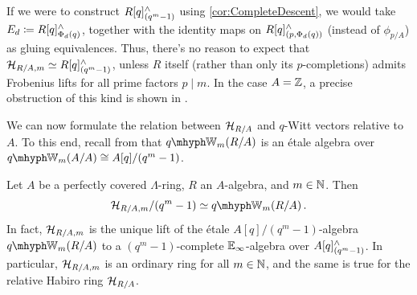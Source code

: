 \documentclass[DIV=12,numbers=enddot,leqno,bibliography=totoc]{scrartcl}
\begin{document}
	\begin{rem}
		If we were to construct $R[q]_{(q^m-1)}^\wedge$ using \cref{cor:CompleteDescent}, we would take $E_d\coloneqq R[q]_{\Phi_d(q)}^\complete$, together with the identity maps on $R[q]_{(p,\Phi_d(q))}^\wedge$ (instead of $\phi_{p/A}$) as gluing equivalences. Thus, there's no reason to expect that $\mathcal{H}_{R/A,  m}\simeq R[q]_{(q^m-1)}^\wedge$, unless $R$ itself (rather than only its $p$-completions) admits Frobenius lifts for all prime factors $p\mid m$. In the case $A=\mathbb{Z}$, a precise obstruction of this kind is shown in \cite[Corollary~]{qWitt}.
	\end{rem}
	We can now formulate the relation between $\mathcal{H}_{R/A}$ and $q$-Witt vectors relative to $A$. To this end, recall from \cite[Proposition~]{qWitt} that $\qIW_m(R/A)$ is an étale algebra over $\qIW_m(A/A)\cong A[q]/(q^m-1)$.
	\begin{thm}\label{thm:HabiroqWittComparison}
		Let $A$ be a perfectly covered $\Lambda$-ring, $R$ an $A$-algebra, and $m\in\mathbb{N}$. Then
		\begin{equation*}
			\Hh_{R/A,  m}/(q^m-1)\simeq \qIW_m(R/A)\,.
		\end{equation*}
		In fact, $\mathcal{H}_{R/A,  m}$ is the unique lift of the étale $A[q]/(q^m-1)$-algebra $\qIW_m(R/A)$ to a $(q^m-1)$-complete $\mathbb{E}_\infty$-algebra over $A[q]_{(q^m-1)}^\wedge$. In particular, $\mathcal{H}_{R/A,  m}$ is an ordinary ring for all $m\in\mathbb{N}$, and the same is true for the relative Habiro ring $\mathcal{H}_{R/A}$.
	\end{thm}
\end{document}

